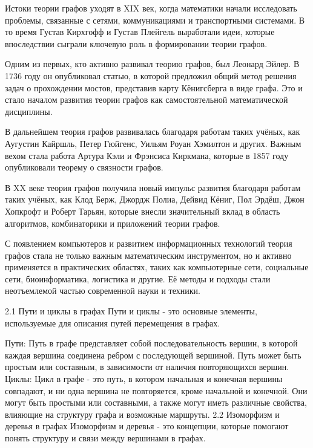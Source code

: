 Истоки теории графов уходят в XIX век, когда математики начали исследовать проблемы, связанные с сетями, коммуникациями и транспортными системами. В то время Густав Кирхгофф и Густав Плейгель выработали идеи, которые впоследствии сыграли ключевую роль в формировании теории графов.

Одним из первых, кто активно развивал теорию графов, был Леонард Эйлер. В 1736 году он опубликовал статью, в которой предложил общий метод решения задач о прохождении мостов, представив карту Кёнигсберга в виде графа. Это и стало началом развития теории графов как самостоятельной математической дисциплины.

В дальнейшем теория графов развивалась благодаря работам таких учёных, как Аугустин Кайршль, Петер Гюйгенс, Уильям Роуан Хэмилтон и других. Важным вехом стала работа Артура Кэли и Фрэнсиса Киркмана, которые в 1857 году опубликовали теорему о связности графов.

В XX веке теория графов получила новый импульс развития благодаря работам таких учёных, как Клод Берж, Джордж Полиа, Дейвид Кёниг, Пол Эрдёш, Джон Хопкрофт и Роберт Тарьян, которые внесли значительный вклад в область алгоритмов, комбинаторики и приложений теории графов.

С появлением компьютеров и развитием информационных технологий теория графов стала не только важным математическим инструментом, но и активно применяется в практических областях, таких как компьютерные сети, социальные сети, биоинформатика, логистика и другие. Её методы и подходы стали неотъемлемой частью современной науки и техники.












2.1 Пути и циклы в графах
Пути и циклы - это основные элементы, используемые для описания путей перемещения в графах.

Пути: Путь в графе представляет собой последовательность вершин, в которой каждая вершина соединена ребром с последующей вершиной. Путь может быть простым или составным, в зависимости от наличия повторяющихся вершин.
Циклы: Цикл в графе - это путь, в котором начальная и конечная вершины совпадают, и ни одна вершина не повторяется, кроме начальной и конечной. Они могут быть простыми или составными, а также могут иметь различные свойства, влияющие на структуру графа и возможные маршруты.
2.2 Изоморфизм и деревья в графах
Изоморфизм и деревья - это концепции, которые помогают понять структуру и связи между вершинами в графах.

